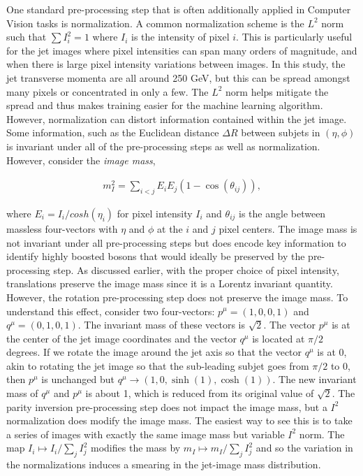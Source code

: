 One standard pre-processing step that is often additionally applied in Computer Vision tasks is normalization.  A common normalization scheme is the $L^2$ norm such that $\sum I_i^2=1$ where $I_i$ is the intensity of pixel $i$.  This is particularly useful for the jet images where pixel intensities can span many orders of magnitude, and when there is large pixel intensity variations between images.  In this study, the jet transverse momenta are all around 250 GeV, but this can be spread amongst many pixels or concentrated in only a few. The $L^2$ norm helps mitigate the spread and thus makes training easier for the machine learning algorithm.  However, normalization can distort information contained within the jet image.  Some information, such as the Euclidean distance $\Delta R$ between subjets in $(\eta,\phi)$ is invariant under all of the pre-processing steps as well as normalization.  However, consider the {\it image mass}, 

\begin{align}
m_I^2=\sum_{i<j} E_iE_j(1-\cos(\theta_{ij})),
\end{align}

\noindent where $E_i=I_i/cosh(\eta_i)$ for pixel intensity $I_i$ and $\theta_{ij}$ is the angle between massless four-vectors with $\eta$ and $\phi$ at the $i$ and $j$ pixel centers.  The image mass is not invariant under all pre-processing steps but does encode key information to identify highly boosted bosons that would ideally be preserved by the pre-processing step.  As discussed earlier, with the proper choice of pixel intensity, translations preserve the image mass since it is a Lorentz invariant quantity.  However, the rotation pre-processing step does not preserve the image mass.  To understand this effect, consider two four-vectors: $p^\mu=(1,0,0,1)$ and $q^\mu=(0,1,0,1)$.   The invariant mass of these vectors is $\sqrt{2}$.  The vector $p^\mu$ is at the center of the jet image coordinates and the vector $q^\mu$ is located at $\pi/2$ degrees.  If we rotate the image around the jet axis so that the vector $q^\mu$ is at $0$, akin to rotating the jet image so that the sub-leading subjet goes from $\pi/2$ to $0$, then $p^\mu$ is unchanged but $q^\mu\rightarrow (1,0,\sinh(1),\cosh(1))$.  The new invariant mass of $q^\mu$ and $p^\mu$ is about 1, which is reduced from its original value of $\sqrt{2}$.  The parity inversion pre-processing step does not impact the image mass, but a $I^2$ normalization does modify the image mass.  The easiest way to see this is to take a series of images with exactly the same image mass but variable $I^2$ norm.  The map $I_i\mapsto I_i/\sum_j I_j^2$ modifies the mass by $m_I\mapsto m_I/\sum_j I_j^2$ and so the variation in the normalizations induces a smearing in the jet-image mass distribution.


